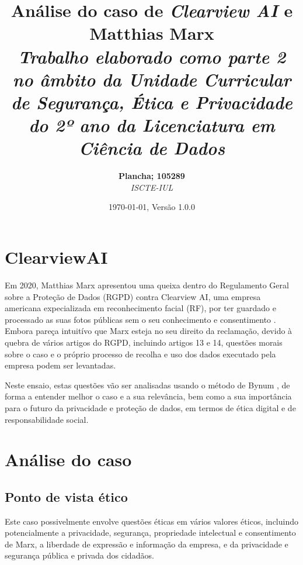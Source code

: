 \documentclass[12pt]{../diazessay}
\title{\textbf{Análise do caso de \textit{Clearview AI} e Matthias Marx} \\ {\Large\itshape Trabalho elaborado como parte 2 no âmbito da Unidade Curricular de Segurança, Ética e Privacidade do 2º ano da Licenciatura em Ciência de Dados}}
\author{\textbf{Plancha; 105289} \\ \textit{ISCTE-IUL}}
\date{\today , Versão 1.0.0}
\begin{document}
\maketitle

\section*{ClearviewAI}
Em 2020, Matthias Marx apresentou uma queixa dentro do Regulamento Geral sobre a Proteção de Dados (RGPD) contra Clearview AI, uma empresa americana expecializada em reconhecimento facial (RF), por ter guardado e processado as suas fotos públicas sem o seu conhecimento e consentimento \parencite{wired}. Embora pareça intuitívo que Marx esteja no seu direito da reclamação, devido à quebra de vários artigos do RGPD, incluindo artigos 13 e 14, questões morais sobre o caso e o próprio processo de recolha e uso dos dados executado pela empresa podem ser levantadas.

Neste ensaio, estas questões vão ser analisadas usando o método de Bynum \parencite{Bynum}, de forma a entender melhor o caso e a sua relevância, bem como a sua importância para o futuro da privacidade e proteção de dados, em termos de ética digital e de responsabilidade social.

\section*{Análise do caso}
\subsection*{Ponto de vista ético}
Este caso possivelmente envolve questões éticas em vários valores éticos, incluindo potencialmente a privacidade, segurança, propriedade intelectual e consentimento de Marx, a liberdade de expressão e informação da empresa, e da privacidade e segurança pública e privada dos cidadãos.
\end{document}
